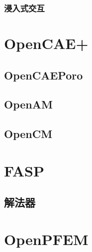 \documentclass[letterpaper,10pt,english]{sphinxmanual}
\begin{document}
\subsection{浸入式交互}
\label{\detokenize{src/fengsim/dt:id3}}
\sphinxstepscope


\chapter{OpenCAE+}
\label{\detokenize{src/opencaeplus/main:opencae}}\label{\detokenize{src/opencaeplus/main::doc}}
\sphinxstepscope


\section{OpenCAEPoro}
\label{\detokenize{src/opencaeplus/opencaeporo:opencaeporo}}\label{\detokenize{src/opencaeplus/opencaeporo::doc}}
\sphinxstepscope


\section{OpenAM}
\label{\detokenize{src/opencaeplus/opencaeam:openam}}\label{\detokenize{src/opencaeplus/opencaeam::doc}}
\sphinxstepscope


\section{OpenCM}
\label{\detokenize{src/opencaeplus/opencaecm:opencm}}\label{\detokenize{src/opencaeplus/opencaecm::doc}}
\sphinxstepscope


\chapter{FASP}
\label{\detokenize{src/fasp/main:fasp}}\label{\detokenize{src/fasp/main::doc}}
\sphinxstepscope


\section{解法器}
\label{\detokenize{src/fasp/fasp:id1}}\label{\detokenize{src/fasp/fasp::doc}}
\sphinxstepscope


\chapter{OpenPFEM}
\label{\detokenize{src/openpfem/main:openpfem}}\label{\detokenize{src/openpfem/main::doc}}
\sphinxstepscope
\end{document}

